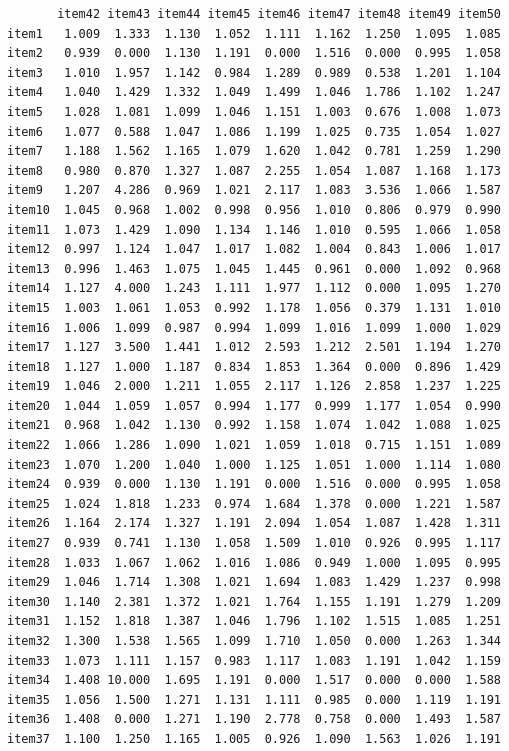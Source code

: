 \documentclass[
  a4paper,
]{ltjsbook}
\begin{document}
\begin{verbatim}
       item42 item43 item44 item45 item46 item47 item48 item49 item50
item1   1.009  1.333  1.130  1.052  1.111  1.162  1.250  1.095  1.085
item2   0.939  0.000  1.130  1.191  0.000  1.516  0.000  0.995  1.058
item3   1.010  1.957  1.142  0.984  1.289  0.989  0.538  1.201  1.104
item4   1.040  1.429  1.332  1.049  1.499  1.046  1.786  1.102  1.247
item5   1.028  1.081  1.099  1.046  1.151  1.003  0.676  1.008  1.073
item6   1.077  0.588  1.047  1.086  1.199  1.025  0.735  1.054  1.027
item7   1.188  1.562  1.165  1.079  1.620  1.042  0.781  1.259  1.290
item8   0.980  0.870  1.327  1.087  2.255  1.054  1.087  1.168  1.173
item9   1.207  4.286  0.969  1.021  2.117  1.083  3.536  1.066  1.587
item10  1.045  0.968  1.002  0.998  0.956  1.010  0.806  0.979  0.990
item11  1.073  1.429  1.090  1.134  1.146  1.010  0.595  1.066  1.058
item12  0.997  1.124  1.047  1.017  1.082  1.004  0.843  1.006  1.017
item13  0.996  1.463  1.075  1.045  1.445  0.961  0.000  1.092  0.968
item14  1.127  4.000  1.243  1.111  1.977  1.112  0.000  1.095  1.270
item15  1.003  1.061  1.053  0.992  1.178  1.056  0.379  1.131  1.010
item16  1.006  1.099  0.987  0.994  1.099  1.016  1.099  1.000  1.029
item17  1.127  3.500  1.441  1.012  2.593  1.212  2.501  1.194  1.270
item18  1.127  1.000  1.187  0.834  1.853  1.364  0.000  0.896  1.429
item19  1.046  2.000  1.211  1.055  2.117  1.126  2.858  1.237  1.225
item20  1.044  1.059  1.057  0.994  1.177  0.999  1.177  1.054  0.990
item21  0.968  1.042  1.130  0.992  1.158  1.074  1.042  1.088  1.025
item22  1.066  1.286  1.090  1.021  1.059  1.018  0.715  1.151  1.089
item23  1.070  1.200  1.040  1.000  1.125  1.051  1.000  1.114  1.080
item24  0.939  0.000  1.130  1.191  0.000  1.516  0.000  0.995  1.058
item25  1.024  1.818  1.233  0.974  1.684  1.378  0.000  1.221  1.587
item26  1.164  2.174  1.327  1.191  2.094  1.054  1.087  1.428  1.311
item27  0.939  0.741  1.130  1.058  1.509  1.010  0.926  0.995  1.117
item28  1.033  1.067  1.062  1.016  1.086  0.949  1.000  1.095  0.995
item29  1.046  1.714  1.308  1.021  1.694  1.083  1.429  1.237  0.998
item30  1.140  2.381  1.372  1.021  1.764  1.155  1.191  1.279  1.209
item31  1.152  1.818  1.387  1.046  1.796  1.102  1.515  1.085  1.251
item32  1.300  1.538  1.565  1.099  1.710  1.050  0.000  1.263  1.344
item33  1.073  1.111  1.157  0.983  1.117  1.083  1.191  1.042  1.159
item34  1.408 10.000  1.695  1.191  0.000  1.517  0.000  0.000  1.588
item35  1.056  1.500  1.271  1.131  1.111  0.985  0.000  1.119  1.191
item36  1.408  0.000  1.271  1.190  2.778  0.758  0.000  1.493  1.587
item37  1.100  1.250  1.165  1.005  0.926  1.090  1.563  1.026  1.191

\end{verbatim}
\end{document}
